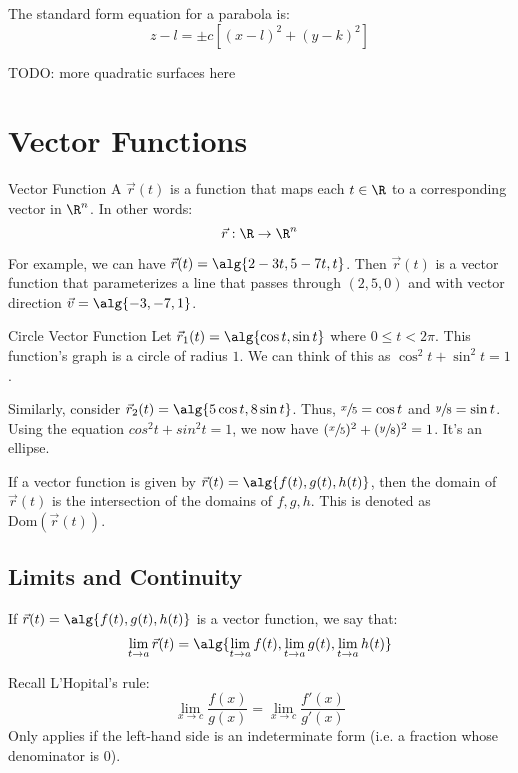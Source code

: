 \documentclass[math]{amznotes}
\begin{document}
The standard form equation for a parabola is:
\[ z - l = \pm c \left[ (x-l)^2 + (y-k)^2 \right] \]

TODO: more quadratic surfaces here

\chapter{Vector Functions}

\begin{dfnbox}{Vector Function}{}
    A  $\vec{r}(t)$ is a function that maps each $t \in \R$ to a corresponding vector in $\R^n$. In other words:
    \[ \vec{r} : \R \to \R^n \]
\end{dfnbox}

For example, we can have $\vec{r}(t) = \alg{2-3t, 5-7t, t}$. Then $\vec{r}(t)$ is a vector function that parameterizes a line that passes through $(2,5,0)$ and with vector direction $\vec{v} = \alg{-3, -7, 1}$.

\begin{exbox}{Circle Vector Function}{}
    Let $\vec{r}_1(t) = \alg{ \cos t, \sin t}$ where $0 \leq t < 2\pi$. This function's graph is a circle of radius $1$. We can think of this as $\cos^2 t + \sin^2 t = 1$.

    Similarly, consider $\vec{r}_2(t) = \alg{ 5 \cos t, 8 \sin t }$. Thus, $\sfrac{x}{5} = \cos t$ and $\sfrac{y}{8} = \sin{t}$. Using the equation $cos^2 t + sin^2 t = 1$, we now have $(\sfrac{x}{5})^2 + (\sfrac{y}{8})^2 = 1$. It's an ellipse.
\end{exbox}

If a vector function is given by $\vec{r}(t) = \alg{f(t), g(t), h(t)}$, then the domain of $\vec{r}(t)$ is the intersection of the domains of $f,g,h$. This is denoted as $\text{Dom}(\vec{r}(t))$.

\section{Limits and Continuity}
If $\vec{r}(t) = \alg{f(t), g(t), h(t)}$ is a vector function, we say that:
\[ \lim_{t \to a} \vec{r}(t) = \alg{ \lim_{t \to a} f(t), \lim_{t \to a} g(t), \lim_{t \to a} h(t) } \]

\begin{notebox}
    Recall L'Hopital's rule:
    \[ \lim_{x \to c} \frac{f(x)}{g(x)} = \lim_{x \to c} \frac{f\prime(x)}{g\prime(x)} \]
    Only applies if the left-hand side is an indeterminate form (i.e. a fraction whose denominator is $0$).
\end{notebox}
\end{document}
